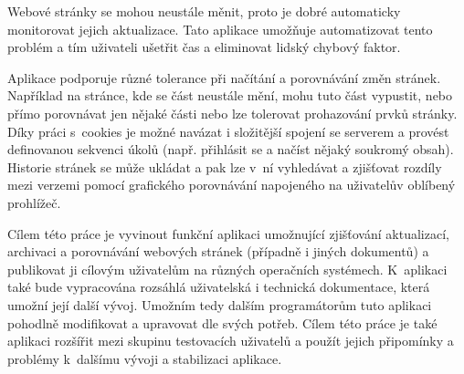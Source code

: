 
Webové stránky se mohou neustále měnit, proto je dobré automaticky monitorovat jejich aktualizace.
Tato aplikace umožňuje automatizovat tento problém a tím uživateli ušetřit čas a eliminovat lidský chybový faktor.

Aplikace podporuje různé tolerance při načítání a porovnávání změn stránek.
Například na stránce, kde se část neustále mění, mohu tuto část vypustit, nebo přímo porovnávat jen nějaké části nebo lze tolerovat prohazování prvků stránky. Díky práci s~cookies je možné navázat i složitější spojení se serverem a provést definovanou sekvenci úkolů (např. přihlásit se a načíst nějaký soukromý obsah). Historie stránek se může ukládat a pak lze v~ní vyhledávat a zjišťovat rozdíly mezi verzemi pomocí grafického porovnávání napojeného na uživatelův oblíbený prohlížeč.


Cílem této práce je vyvinout funkční aplikaci umožnující zjišťování aktualizací, archivaci a porovnávání webových stránek (případně i jiných dokumentů) a publikovat ji cílovým uživatelům na různých operačních systémech.
K~aplikaci také bude vypracována rozsáhlá uživatelská i technická dokumentace, která umožní její další vývoj.
Umožním tedy dalším programátorům tuto aplikaci pohodlně modifikovat a upravovat dle svých potřeb.
Cílem této práce je také aplikaci rozšířit mezi skupinu testovacích uživatelů a použít jejich připomínky a problémy k~dalšímu vývoji a stabilizaci aplikace.
